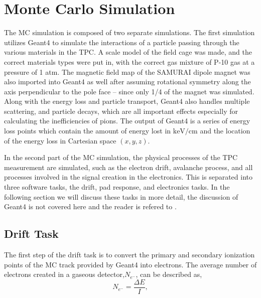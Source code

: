 


\section{Monte Carlo Simulation}
\label{sec:monteCarlo}

The MC simulation is composed of two separate simulations. The first simulation utilizes Geant4 to simulate the interactions of a particle passing through the various materials in the TPC. A scale model of the field cage was made, and the correct materials types were put in, with the correct gas mixture of P-10 gas at a pressure of 1 atm. The magnetic field map of the SAMURAI dipole magnet was also imported into Geant4 as well after assuming rotational symmetry along the axis perpendicular to the pole face -- since only 1/4 of the magnet was simulated. Along with the energy loss and particle transport, Geant4 also handles multiple scattering, and particle decays, which are all important effects especially for calculating the inefficiencies of pions. The output of Geant4 is a series of energy loss points which contain the amount of energy lost in $\si{\kilo\electronvolt\per\centi\metre}$ and the location of the energy loss in Cartesian space $(x,y,z)$. 

In the second part of the MC simulation, the physical processes of the TPC measurement are simulated, such as the electron drift, avalanche process, and all processes involved in the signal creation in the electronics. This is separated into three software tasks, the drift, pad response, and electronics tasks. In the following section we will discuss these tasks in more detail, the discussion of Geant4 is not covered here and the reader is refered to \cite{geant4}.  

\subsection{Drift Task}
 
 The first step of the drift task is to convert the primary and secondary ionization points of the MC track provided by Geant4 into electrons. The average number of electrons created in a gaseous detector,$N_{e^-}$, can be described as,
\begin{equation}
N_{e^{-}} =  \frac{\Delta E}{I},
\label{eq:kev2el}
\end{equation}
 
